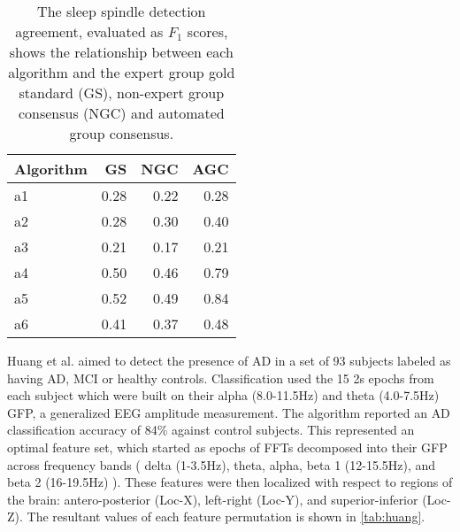 \begin{table}[ht]
\caption[Sleep Spindle Detection F1 Score]{The sleep spindle detection agreement, evaluated as $F_{1}$ scores, shows the relationship between each algorithm and the expert group gold standard (GS), non-expert group consensus (NGC) and automated group consensus.}
\centering
\begin{tabular}{ l r r r }
\toprule
Algorithm & GS & NGC & AGC \\
\midrule
a1 & 0.28 & 0.22 & 0.28 \\
a2 & 0.28 & 0.30 & 0.40 \\
a3 & 0.21 & 0.17 & 0.21 \\
a4 & 0.50 & 0.46 & 0.79 \\
a5 & 0.52 & 0.49 & 0.84 \\
a6 & 0.41 & 0.37 & 0.48 \\
\bottomrule
\end{tabular}
\label{tab:warby}
\end{table}

Huang et al. \cite{Huang2000} aimed to detect the presence of \ac{AD} in a set of 93 subjects labeled as having \ac{AD}, \ac{MCI} or healthy controls. Classification used the 15 2s epochs from each subject which were built on their alpha (8.0-11.5Hz) and theta (4.0-7.5Hz) \ac{GFP}, a generalized \ac{EEG} amplitude measurement. The algorithm reported an \ac{AD} classification accuracy of 84\% against control subjects. This represented an optimal feature set, which started as epochs of \acp{FFT} decomposed into their \ac{GFP} across frequency bands ( delta (1-3.5Hz), theta, alpha, beta 1 (12-15.5Hz), and beta 2 (16-19.5Hz) ). These features were then localized with respect to regions of the brain: antero-posterior (Loc-X), left-right (Loc-Y), and superior-inferior (Loc-Z). The resultant values of each feature permutation is shown in \cref{tab:huang}.

